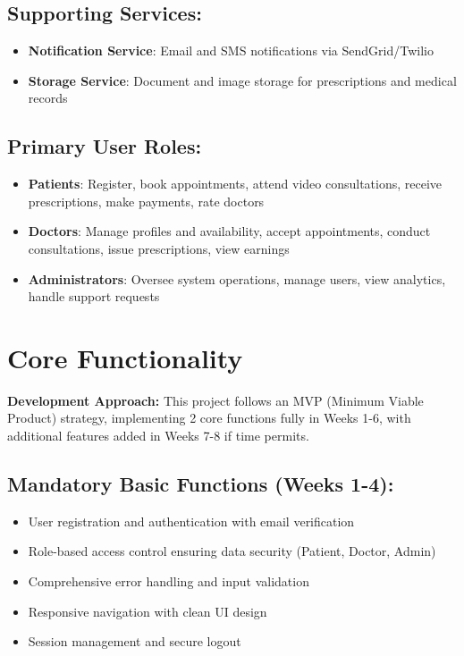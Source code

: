 \documentclass[11pt,a4paper]{article}
\begin{document}
\subsection*{Supporting Services:}
\begin{itemize}[leftmargin=*, itemsep=0.1em]
    \item \textbf{Notification Service}: Email and SMS notifications via SendGrid/Twilio
    \item \textbf{Storage Service}: Document and image storage for prescriptions and medical records
\end{itemize}

\subsection*{Primary User Roles:}
\begin{itemize}[leftmargin=*, itemsep=0.1em]
    \item \textbf{Patients}: Register, book appointments, attend video consultations, receive prescriptions, make payments, rate doctors
    \item \textbf{Doctors}: Manage profiles and availability, accept appointments, conduct consultations, issue prescriptions, view earnings
    \item \textbf{Administrators}: Oversee system operations, manage users, view analytics, handle support requests
\end{itemize}

\section{Core Functionality}

\textbf{Development Approach:} This project follows an MVP (Minimum Viable Product) strategy, implementing 2 core functions fully in Weeks 1-6, with additional features added in Weeks 7-8 if time permits.

\subsection*{Mandatory Basic Functions (Weeks 1-4):}
\begin{itemize}[leftmargin=*, itemsep=0.1em]
    \item User registration and authentication with email verification
    \item Role-based access control ensuring data security (Patient, Doctor, Admin)
    \item Comprehensive error handling and input validation
    \item Responsive navigation with clean UI design
    \item Session management and secure logout
\end{itemize}
\end{document}
